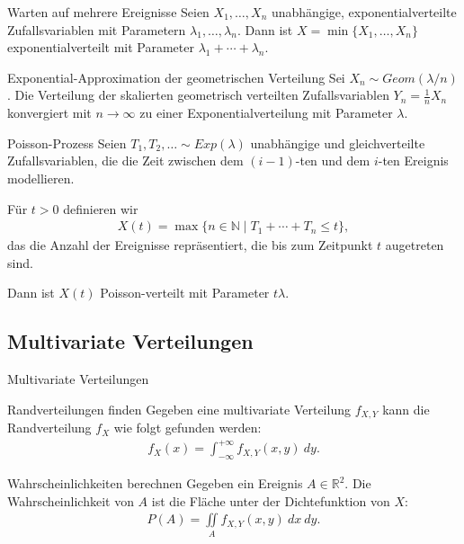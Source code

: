 \documentclass{beamer}
\def\padding{\vspace{0.5cm}}
\begin{document}
\begin{frame}
    \begin{block}{Warten auf mehrere Ereignisse}
        Seien $X_1, \dots, X_n$ unabhängige, exponentialverteilte Zufallsvariablen mit Parametern $\lambda_1, \dots, \lambda_n$. Dann ist $X = \min \{X_1, \dots, X_n\}$ exponentialverteilt mit Parameter $\lambda_1 + \cdots + \lambda_n$.
    \end{block}\pause\par\padding
    \begin{block}{Exponential-Approximation der geometrischen Verteilung}
        Sei $X_n \sim Geom(\lambda / n)$. Die Verteilung der skalierten geometrisch verteilten Zufallsvariablen $Y_n = \frac{1}{n} X_n$ konvergiert mit $n \to \infty$ zu einer Exponentialverteilung mit Parameter $\lambda$.
    \end{block}
\end{frame}

\begin{frame}
    \begin{block}{Poisson-Prozess}
        Seien $T_1, T_2, \ldots \sim Exp(\lambda)$ unabhängige und gleichverteilte Zufallsvariablen, die die Zeit zwischen dem $(i - 1)$-ten und dem $i$-ten Ereignis modellieren.\pause\par
        Für $t > 0$ definieren wir
        \begin{align*}
            X(t) = \max \{n \in \mathbb{N} \mid T_1 + \cdots + T_n \leq t\},
        \end{align*}
        das die Anzahl der Ereignisse repräsentiert, die bis zum Zeitpunkt $t$ augetreten sind.\pause\par
        Dann ist $X(t)$ Poisson-verteilt mit Parameter $t \lambda$.
    \end{block}
\end{frame}

\subsection{Multivariate Verteilungen}
\begin{frame}{Multivariate Verteilungen}
    \begin{block}{Randverteilungen finden}
        Gegeben eine multivariate Verteilung $f_{X,Y}$ kann die Randverteilung $f_X$ wie folgt gefunden werden:
        \begin{align*}
            f_X(x) = \int_{- \infty}^{+ \infty} f_{X,Y}(x,y)\ dy.
        \end{align*}
    \end{block}\pause\par\padding
    \begin{block}{Wahrscheinlichkeiten berechnen}
        Gegeben ein Ereignis $A \in \mathbb{R}^2$. Die Wahrscheinlichkeit von $A$ ist die Fläche unter der Dichtefunktion von $X$:
        \begin{align*}
            P(A) = \iint\limits_{A} f_{X,Y}(x,y)\ dx\ dy.
        \end{align*}
    \end{block}
\end{frame}
\end{document}
